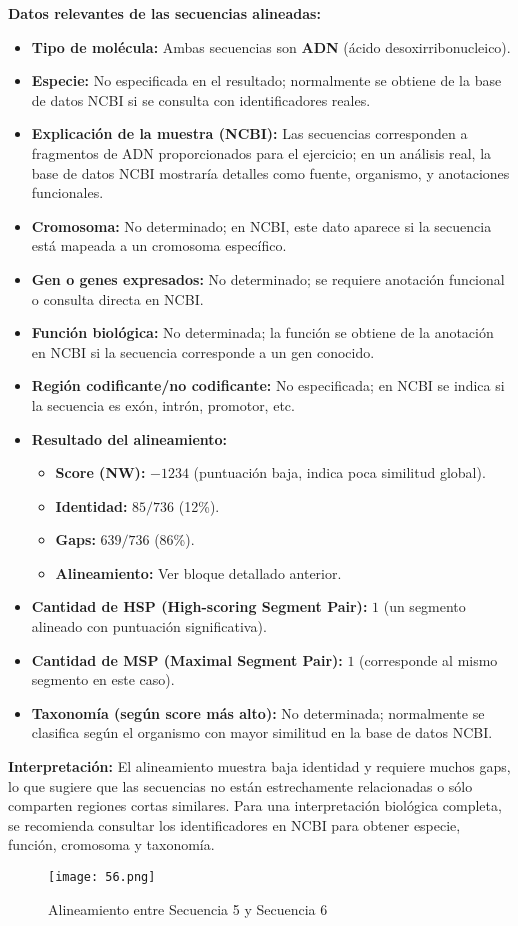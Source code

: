 \documentclass[fleqn,10pt]{article}
\begin{document}
\textbf{Datos relevantes de las secuencias alineadas:}
\begin{itemize}
    \item \textbf{Tipo de molécula:} Ambas secuencias son \textbf{ADN} (ácido desoxirribonucleico).
    \item \textbf{Especie:} No especificada en el resultado; normalmente se obtiene de la base de datos NCBI si se consulta con identificadores reales.
    \item \textbf{Explicación de la muestra (NCBI):} Las secuencias corresponden a fragmentos de ADN proporcionados para el ejercicio; en un análisis real, la base de datos NCBI mostraría detalles como fuente, organismo, y anotaciones funcionales.
    \item \textbf{Cromosoma:} No determinado; en NCBI, este dato aparece si la secuencia está mapeada a un cromosoma específico.
    \item \textbf{Gen o genes expresados:} No determinado; se requiere anotación funcional o consulta directa en NCBI.
    \item \textbf{Función biológica:} No determinada; la función se obtiene de la anotación en NCBI si la secuencia corresponde a un gen conocido.
    \item \textbf{Región codificante/no codificante:} No especificada; en NCBI se indica si la secuencia es exón, intrón, promotor, etc.
    \item \textbf{Resultado del alineamiento:}
    \begin{itemize}
        \item \textbf{Score (NW):} $-1234$ (puntuación baja, indica poca similitud global).
        \item \textbf{Identidad:} $85/736$ (12\%).
        \item \textbf{Gaps:} $639/736$ (86\%).
        \item \textbf{Alineamiento:} Ver bloque detallado anterior.
    \end{itemize}
    \item \textbf{Cantidad de HSP (High-scoring Segment Pair):} $1$ (un segmento alineado con puntuación significativa).
    \item \textbf{Cantidad de MSP (Maximal Segment Pair):} $1$ (corresponde al mismo segmento en este caso).
    \item \textbf{Taxonomía (según score más alto):} No determinada; normalmente se clasifica según el organismo con mayor similitud en la base de datos NCBI.
\end{itemize}

\textbf{Interpretación:} El alineamiento muestra baja identidad y requiere muchos gaps, lo que sugiere que las secuencias no están estrechamente relacionadas o sólo comparten regiones cortas similares. Para una interpretación biológica completa, se recomienda consultar los identificadores en NCBI para obtener especie, función, cromosoma y taxonomía.

\begin{figure}[htbp]
    \centering
    \texttt{[image: 56.png]}
    \caption{Alineamiento entre Secuencia 5 y Secuencia 6}
    \label{fig:aln-5-6}
\end{figure}
\end{document}
